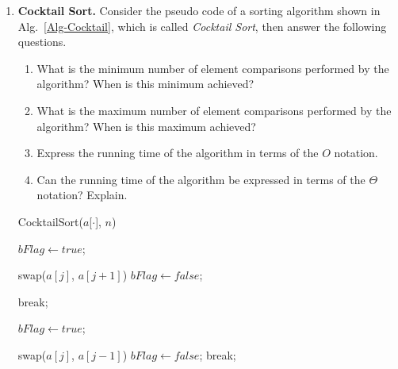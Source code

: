 \documentclass[12pt,a4paper]{article}
\theoremstyle{definition}
\begin{document}
\begin{enumerate}

\item \textbf{Cocktail Sort.} Consider the pseudo code of a sorting algorithm shown in Alg.~\ref{Alg-Cocktail}, which is called \emph{Cocktail Sort}, then answer the following questions.


\begin{minipage}[t]{0.4\textwidth}
\begin{enumerate}
\item What is the minimum number of element comparisons performed by the algorithm? When is this minimum achieved?
\item What is the maximum number of element comparisons performed by the algorithm? When is this maximum achieved?
\item Express the running time of the algorithm in terms of the $O$ notation.
\item Can the running time of the algorithm be expressed in terms of the $\Theta$ notation? Explain.
\end{enumerate}
\end{minipage}
\hspace{2mm}
\begin{minipage}[t]{0.5\textwidth}
\begin{algorithm}[H]
		\caption{CocktailSort($a$[$\cdot$], $n$)} \label{Alg-Cocktail}
		{
			$bFlag \leftarrow true$;
			
			{
				{
					swap($a[j]$, $a[j+1]$)\;
					$bFlag \leftarrow false$;
				}
			}
			
			{
				break;
			}
			
			$bFlag \leftarrow true$;			
			
			{
				{
					swap($a[j]$, $a[j-1]$)\;
					$bFlag \leftarrow false$;
				}
			}
			{
				break;
			}
		}
\end{algorithm}
\end{minipage}


\end{enumerate}
\end{document}
